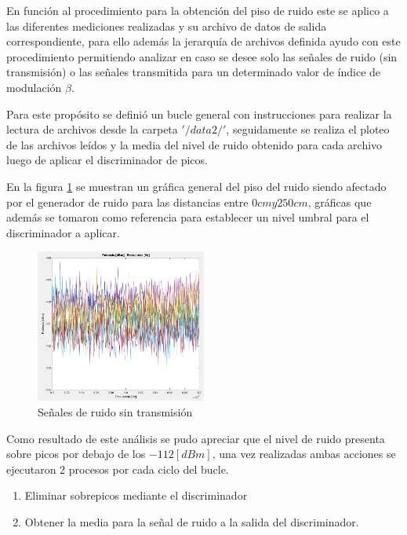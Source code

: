 \documentclass[conference]{IEEEtran}
\begin{document}
	En función al procedimiento para la obtención del piso de ruido este se aplico a las diferentes mediciones realizadas y su archivo de datos de salida correspondiente, para ello además la jerarquía de archivos definida ayudo con este procedimiento permitiendo analizar en caso se desee solo las señales de ruido (sin transmisión) o las señales transmitida para un determinado valor de índice de modulación $\beta$.
	
	Para este propósito se definió un bucle general con instrucciones para realizar la lectura de archivos desde la carpeta $'/data2/'$, seguidamente se realiza el ploteo de las archivos leídos y la media del nivel de ruido obtenido para cada archivo luego de aplicar el discriminador de picos.
	
	En la figura \ref{fig:seniales-ruido} se muestran un gráfica general del piso del ruido siendo afectado por el generador de ruido para las distancias entre $0cm y 250cm$, gráficas que además se tomaron como referencia para establecer un nivel umbral para el discriminador a aplicar.
	
	\begin{figure}[h]
		\centering
		\includegraphics[width=0.5\textwidth]{media/seniales-ruido}
		\caption{Señales de ruido sin transmisión}
		\label{fig:seniales-ruido}
	\end{figure}
	
	Como resultado de este análisis se pudo apreciar que el nivel de ruido presenta sobre picos por debajo de los $-112 [dBm]$, una vez realizadas ambas acciones se ejecutaron 2 procesos por cada ciclo del bucle.
	
	\begin{enumerate}
		\item Eliminar sobrepicos mediante el discriminador
		\item Obtener la media para la señal de ruido a la salida del discriminador.
	\end{enumerate}
	
\end{document}
